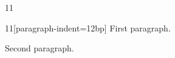 \documentclass[paper=A4]{ropas-poster}
\begin{document}
\begin{postergrid}{1}{1}
\begin{posterblock}{1}{1}[paragraph-indent=12bp]
First paragraph.

Second paragraph.
\end{posterblock}
\end{postergrid}
\end{document}
